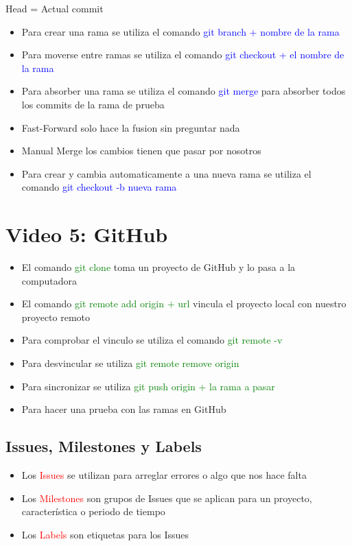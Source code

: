 \documentclass{article}
\begin{document}
	Head = Actual commit
	
	\begin{itemize}
	\item Para crear una rama se utiliza el comando \textcolor{blue}{git branch $+$ nombre de la rama}
	\item Para moverse entre ramas se utiliza el comando \textcolor{blue}{git checkout + el nombre de la rama}
	\item Para absorber una rama se utiliza el comando \textcolor{blue}{git merge} para absorber todos los commits de la rama de prueba
	\item Fast-Forward solo hace la fusion sin preguntar nada
	\item Manual Merge los cambios tienen que pasar por nosotros
	\item Para crear y cambia automaticamente a una nueva rama se utiliza el comando \textcolor{blue}{git checkout -b nueva rama}
	\end{itemize}

	\section{Video 5: GitHub}
	
	\begin{itemize}
		
	\item El comando \textcolor{green}{git clone} toma un proyecto de GitHub y lo pasa a la computadora
	\item El comando \textcolor{green}{git remote add origin $+$ url} vincula el proyecto local con nuestro proyecto remoto
	\item Para comprobar el vinculo se utiliza el comando \textcolor{green}{git remote -v}
	\item Para desvincular se utiliza \textcolor{green}{git remote remove origin}
	\item Para sincronizar se utiliza \textcolor{green}{git push origin + la rama a pasar}
	\item Para hacer una prueba con las ramas en GitHub
	\end{itemize}
	
	\subsection{Issues, Milestones y Labels}
	
	\begin{itemize}
		\item Los \textcolor{red}{Issues} se utilizan para arreglar errores o algo que nos hace falta
		\item Los \textcolor{red}{Milestones} son grupos de Issues que se aplican para un proyecto, característica o periodo de tiempo
		\item Los \textcolor{red}{Labels} son etiquetas para los Issues
	\end{itemize}
\end{document}
